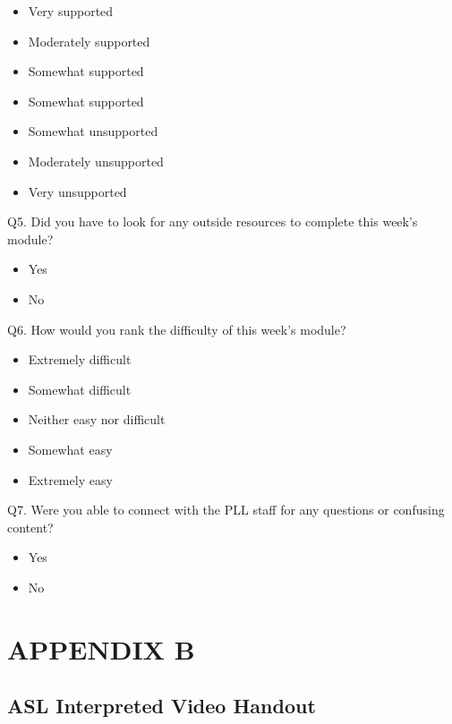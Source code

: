 \documentclass[11.5pt]{sig-alternate} %
\begin{document}
\begin{large}
\begin{itemize}
    \item Very supported 
    \item Moderately supported 
    \item Somewhat supported 
    \item Somewhat supported 
    \item Somewhat unsupported 
    \item Moderately unsupported 
    \item Very unsupported 
\end{itemize}

Q5. Did you have to look for any outside resources to complete this week’s module?

\begin{itemize}
    \item Yes
    \item No
\end{itemize}

Q6. How would you rank the difficulty of this week’s module? 

\begin{itemize}
    \item Extremely difficult 
    \item Somewhat difficult 
    \item Neither easy nor difficult 
    \item Somewhat easy
    \item Extremely easy
\end{itemize}

Q7. Were you able to connect with the PLL staff for any questions or confusing content?

\begin{itemize}
    \item Yes
    \item No
\end{itemize}

\clearpage

\onecolumn
\section*{APPENDIX B}
\subsection*{ASL Interpreted Video Handout}



\end{large}
\end{document}
